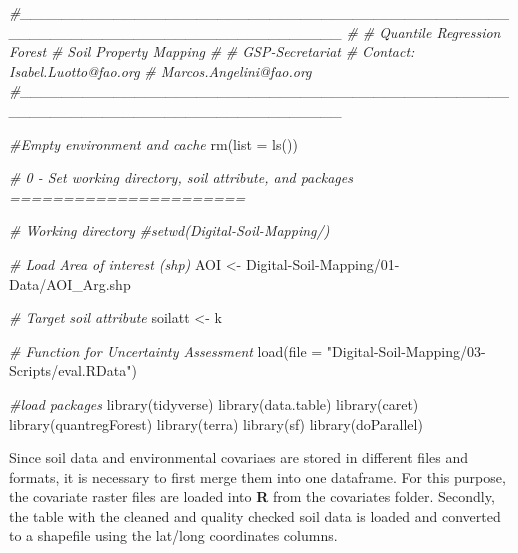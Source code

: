 \documentclass[
  10pt,
  b5paper,
  oneside]{book}
\newenvironment{Shaded}{\begin{snugshade}}{\end{snugshade}}
\newcommand{\AttributeTok}[1]{\textcolor[rgb]{0.77,0.63,0.00}{#1}}
\newcommand{\CommentTok}[1]{\textcolor[rgb]{0.56,0.35,0.01}{\textit{#1}}}
\newcommand{\FunctionTok}[1]{\textcolor[rgb]{0.00,0.00,0.00}{#1}}
\newcommand{\NormalTok}[1]{#1}
\newcommand{\OtherTok}[1]{\textcolor[rgb]{0.56,0.35,0.01}{#1}}
\newcommand{\StringTok}[1]{\textcolor[rgb]{0.31,0.60,0.02}{#1}}
\begin{document}
\begin{Shaded}
\begin{Highlighting}[]
\CommentTok{\#\_\_\_\_\_\_\_\_\_\_\_\_\_\_\_\_\_\_\_\_\_\_\_\_\_\_\_\_\_\_\_\_\_\_\_\_\_\_\_\_\_\_\_\_\_\_\_\_\_\_\_\_\_\_\_\_\_\_\_\_\_\_\_\_\_\_\_\_\_\_\_\_\_\_\_\_\_\_\_}
\CommentTok{\#}
\CommentTok{\# Quantile Regression Forest}
\CommentTok{\# Soil Property Mapping}
\CommentTok{\#}
\CommentTok{\# GSP{-}Secretariat}
\CommentTok{\# Contact: Isabel.Luotto@fao.org}
\CommentTok{\#          Marcos.Angelini@fao.org}
\CommentTok{\#\_\_\_\_\_\_\_\_\_\_\_\_\_\_\_\_\_\_\_\_\_\_\_\_\_\_\_\_\_\_\_\_\_\_\_\_\_\_\_\_\_\_\_\_\_\_\_\_\_\_\_\_\_\_\_\_\_\_\_\_\_\_\_\_\_\_\_\_\_\_\_\_\_\_\_\_\_\_\_}

\CommentTok{\#Empty environment and cache }
\FunctionTok{rm}\NormalTok{(}\AttributeTok{list =} \FunctionTok{ls}\NormalTok{())}

\CommentTok{\# 0 {-} Set working directory, soil attribute, and packages ======================}

\CommentTok{\# Working directory}
\CommentTok{\#setwd(\textquotesingle{}Digital{-}Soil{-}Mapping/\textquotesingle{})}

\CommentTok{\# Load Area of interest (shp)}
\NormalTok{AOI }\OtherTok{\textless{}{-}} \StringTok{\textquotesingle{}Digital{-}Soil{-}Mapping/01{-}Data/AOI\_Arg.shp\textquotesingle{}}

\CommentTok{\# Target soil attribute}
\NormalTok{soilatt }\OtherTok{\textless{}{-}} \StringTok{\textquotesingle{}k\textquotesingle{}}

\CommentTok{\# Function for Uncertainty Assessment}
\FunctionTok{load}\NormalTok{(}\AttributeTok{file =} \StringTok{"Digital{-}Soil{-}Mapping/03{-}Scripts/eval.RData"}\NormalTok{)}

\CommentTok{\#load packages}
\FunctionTok{library}\NormalTok{(tidyverse)}
\FunctionTok{library}\NormalTok{(data.table)}
\FunctionTok{library}\NormalTok{(caret)}
\FunctionTok{library}\NormalTok{(quantregForest)}
\FunctionTok{library}\NormalTok{(terra)}
\FunctionTok{library}\NormalTok{(sf)}
\FunctionTok{library}\NormalTok{(doParallel)}
\end{Highlighting}
\end{Shaded}

Since soil data and environmental covariaes are stored in different files and formats, it is necessary to first merge them into one dataframe. For this purpose, the covariate raster files are loaded into \textbf{R} from the covariates folder. Secondly, the table with the cleaned and quality checked soil data is loaded and converted to a shapefile using the lat/long coordinates columns.
\end{document}

